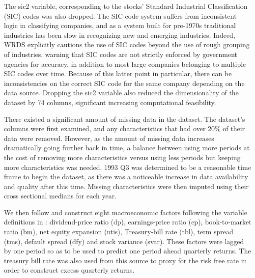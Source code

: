 \documentclass{article}
\begin{document}
The sic2 variable, corresponding to the stocks' Standard Industrial Classification (SIC) codes was also dropped. The SIC code system suffers from inconsistent logic in classifying companies, and as a system built for pre-1970s traditional industries has been slow in recognizing new and emerging industries. Indeed, WRDS explicitly cautions the use of SIC codes beyond the use of rough grouping of industries, warning that SIC codes are not strictly enforced by government agencies for accuracy, in addition to most large companies belonging to multiple SIC codes over time. Because of this latter point in particular, there can be inconsistencies on the correct SIC code for the same company depending on the data source. Dropping the sic2 variable also reduced the dimensionality of the dataset by 74 columns, significant increasing computational feasibility.

There existed a significant amount of missing data in the dataset. The dataset's columns were first examined, and any characteristics that had over 20\% of their data were removed. However, as the amount of missing data increases dramatically going further back in time, a balance between using more periods at the cost of removing more characteristics versus using less periods but keeping more characteristics was needed. 1993 Q3 was determined to be a reasonable time frame to begin the dataset, as there was a noticeable increase in data availability and quality after this time.  Missing characteristics were then imputed using their cross sectional medians for each year. 

We then follow \cite{gu_empirical_2018} and construct eight macroeconomic factors following the variable definitions in \cite{welch_comprehensive_2008}: dividend-price ratio (dp), earnings-price ratio (ep), book-to-market ratio (bm), net equity expansion (ntis), Treasury-bill rate (tbl), term spread (tms), default spread (dfy) and stock variance (svar). These factors were lagged by one period so as to be used to predict one period ahead quarterly returns. The treasury bill rate was also used from this source to proxy for the risk free rate in order to construct excess quarterly returns. 
\end{document}
